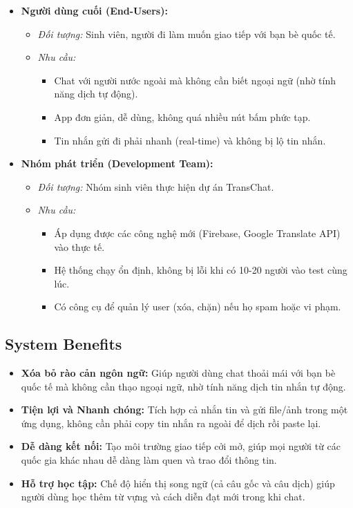 \documentclass[a4paper, 12pt]{article}
\begin{document}
	
	\begin{itemize}
		\item \textbf{Người dùng cuối (End-Users):}
		\begin{itemize}
			\item \textit{Đối tượng: } Sinh viên, người đi làm muốn giao tiếp với bạn bè quốc tế.
			\item \textit{Nhu cầu: }
			\begin{itemize}
				\item Chat với người nước ngoài mà không cần biết ngoại ngữ (nhờ tính năng dịch tự động).
				\item App đơn giản, dễ dùng, không quá nhiều nút bấm phức tạp.
				\item Tin nhắn gửi đi phải nhanh (real-time) và không bị lộ tin nhắn.
			\end{itemize}
		\end{itemize}
		
		\item \textbf{Nhóm phát triển (Development Team):}
		\begin{itemize}
			\item \textit{Đối tượng: } Nhóm sinh viên thực hiện dự án TransChat.
			\item \textit{Nhu cầu: }
			\begin{itemize}
				\item Áp dụng được các công nghệ mới (Firebase, Google Translate API) vào thực tế.
				\item Hệ thống chạy ổn định, không bị lỗi khi có 10-20 người vào test cùng lúc.
				\item Có công cụ để quản lý user (xóa, chặn) nếu họ spam hoặc vi phạm.
			\end{itemize}
		\end{itemize}
	\end{itemize}
	
	\subsection{System Benefits}
	\begin{itemize}
		\item \textbf{Xóa bỏ rào cản ngôn ngữ:} Giúp người dùng chat thoải mái với bạn bè quốc tế mà không cần thạo ngoại ngữ, nhờ tính năng dịch tin nhắn tự động.
		\item \textbf{Tiện lợi và Nhanh chóng:} Tích hợp cả nhắn tin và gửi file/ảnh trong một ứng dụng, không cần phải copy tin nhắn ra ngoài để dịch rồi paste lại.
		\item \textbf{Dễ dàng kết nối:} Tạo môi trường giao tiếp cởi mở, giúp mọi người từ các quốc gia khác nhau dễ dàng làm quen và trao đổi thông tin.
		\item \textbf{Hỗ trợ học tập:} Chế độ hiển thị song ngữ (cả câu gốc và câu dịch) giúp người dùng học thêm từ vựng và cách diễn đạt mới trong khi chat.
	\end{itemize}
\end{document}
